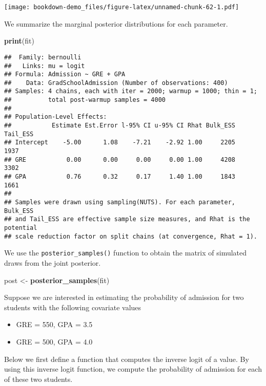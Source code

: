 \documentclass[
]{book}
\newenvironment{Shaded}{\begin{snugshade}}{\end{snugshade}}
\newcommand{\KeywordTok}[1]{\textcolor[rgb]{0.13,0.29,0.53}{\textbf{#1}}}
\newcommand{\NormalTok}[1]{#1}
\newcommand{\StringTok}[1]{\textcolor[rgb]{0.31,0.60,0.02}{#1}}
\providecommand{\tightlist}{%
  \setlength{\itemsep}{0pt}\setlength{\parskip}{0pt}}
\begin{document}
\texttt{[image: bookdown-demo\_files/figure-latex/unnamed-chunk-62-1.pdf]}

We summarize the marginal posterior distributions for each parameter.

\begin{Shaded}
\begin{Highlighting}[]
\KeywordTok{print}\NormalTok{(fit)}
\end{Highlighting}
\end{Shaded}

\begin{verbatim}
##  Family: bernoulli 
##   Links: mu = logit 
## Formula: Admission ~ GRE + GPA 
##    Data: GradSchoolAdmission (Number of observations: 400) 
## Samples: 4 chains, each with iter = 2000; warmup = 1000; thin = 1;
##          total post-warmup samples = 4000
## 
## Population-Level Effects: 
##           Estimate Est.Error l-95% CI u-95% CI Rhat Bulk_ESS Tail_ESS
## Intercept    -5.00      1.08    -7.21    -2.92 1.00     2205     1937
## GRE           0.00      0.00     0.00     0.00 1.00     4208     3302
## GPA           0.76      0.32     0.17     1.40 1.00     1843     1661
## 
## Samples were drawn using sampling(NUTS). For each parameter, Bulk_ESS
## and Tail_ESS are effective sample size measures, and Rhat is the potential
## scale reduction factor on split chains (at convergence, Rhat = 1).
\end{verbatim}

We use the \texttt{posterior\_samples()} function to obtain the matrix of simulated draws from the joint posterior.

\begin{Shaded}
\begin{Highlighting}[]
\NormalTok{post <-}\StringTok{ }\KeywordTok{posterior_samples}\NormalTok{(fit)}
\end{Highlighting}
\end{Shaded}

Suppose we are interested in estimating the probability of admission for two students with the following covariate values

\begin{itemize}
\tightlist
\item
  GRE = 550, GPA = 3.5
\item
  GRE = 500, GPA = 4.0
\end{itemize}

Below we first define a function that computes the inverse logit of a value. By using this inverse logit function, we compute the probability of admission for each of these two students.
\end{document}

